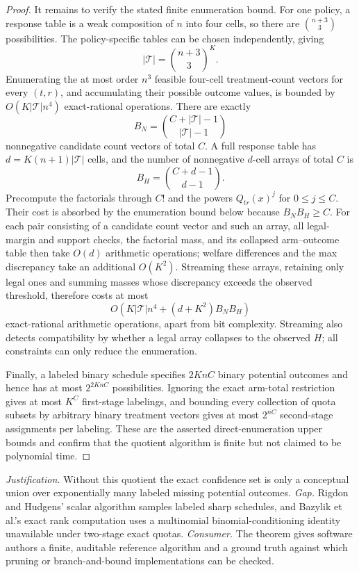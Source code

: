 \documentclass{article}
\begin{document}
\begin{proof}
It remains to verify the stated finite enumeration bound.  For one policy, a response table is a weak composition of \(n\) into four cells, so there are \(\binom{n+3}{3}\) possibilities.  The policy-specific tables can be chosen independently, giving
\[
 |\mathcal T|=\binom{n+3}{3}^{K}.
\]
Enumerating the at most order \(n^3\) feasible four-cell treatment-count vectors for every \((t,r)\), and accumulating their possible outcome values, is bounded by \(O(K|\mathcal T|n^4)\) exact-rational operations.  There are exactly
\[
 B_N=\binom{C+|\mathcal T|-1}{|\mathcal T|-1}
\]
nonnegative candidate count vectors of total \(C\).  A full response table has
\(d=K(n+1)|\mathcal T|\) cells, and the number of nonnegative \(d\)-cell arrays of total \(C\) is
\[
 B_H=\binom{C+d-1}{d-1}.
\]
Precompute the factorials through \(C!\) and the powers \(Q_{tr}(x)^j\) for \(0\le j\le C\).  Their cost is absorbed by the enumeration bound below because \(B_NB_H\ge C\).  For each pair consisting of a candidate count vector and such an array, all legal-margin and support checks, the factorial mass, and its collapsed arm--outcome table then take \(O(d)\) arithmetic operations; welfare differences and the max discrepancy take an additional \(O(K^2)\).  Streaming these arrays, retaining only legal ones and summing masses whose discrepancy exceeds the observed threshold, therefore costs at most
\[
 O\!\left(K|\mathcal T|n^4+(d+K^2)B_NB_H\right)
\]
exact-rational arithmetic operations, apart from bit complexity.  Streaming also detects compatibility by whether a legal array collapses to the observed \(H\); all constraints can only reduce the enumeration.

Finally, a labeled binary schedule specifies \(2KnC\) binary potential outcomes and hence has at most \(2^{2KnC}\) possibilities.  Ignoring the exact arm-total restriction gives at most \(K^C\) first-stage labelings, and bounding every collection of quota subsets by arbitrary binary treatment vectors gives at most \(2^{nC}\) second-stage assignments per labeling.  These are the asserted direct-enumeration upper bounds and confirm that the quotient algorithm is finite but not claimed to be polynomial time.
\end{proof}
\par\smallskip\noindent \textit{Justification.} Without this quotient the exact confidence set is only a conceptual union over exponentially many labeled missing potential outcomes. \textit{Gap.} Rigdon and Hudgens' scalar algorithm samples labeled sharp schedules, and Bazylik et al.'s exact rank computation uses a multinomial binomial-conditioning identity unavailable under two-stage exact quotas. \textit{Consumer.} The theorem gives software authors a finite, auditable reference algorithm and a ground truth against which pruning or branch-and-bound implementations can be checked.
\end{document}

